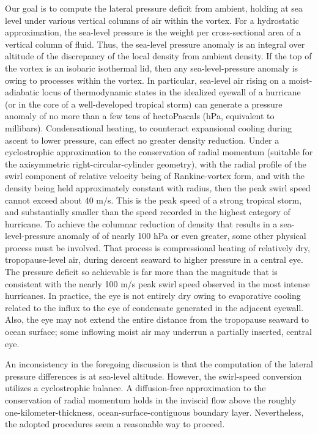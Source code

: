 \documentclass[preprint, prX]{revtex4}
\begin{document}
Our goal is to compute the lateral pressure deficit from ambient, holding at sea level under various vertical columns of air within the vortex. For a hydrostatic approximation, the sea-level pressure is the weight per cross-sectional area of a vertical column of fluid. Thus, the sea-level pressure anomaly is an integral over altitude of the discrepancy of the local density from ambient density. If the top of the vortex is an isobaric isothermal lid, then any sea-level-pressure anomaly is owing to processes within the vortex.
In particular, sea-level air rising on a moist-adiabatic locus of thermodynamic states in the idealized eyewall of a hurricane (or in the core of a well-developed tropical storm) can generate a pressure anomaly of no more than a few tens of hectoPascals (hPa, equivalent to millibars). Condensational heating, to counteract expansional cooling during ascent to lower pressure, can effect no greater density reduction. Under a cyclostrophic approximation to the conservation of radial momentum (suitable for the axisymmetric right-circular-cylinder geometry), with the radial profile of the swirl component of relative velocity being of Rankine-vortex form, and with the density being held approximately constant with radius, then the peak swirl speed cannot exceed about 40 m/s. This is the peak speed of a strong tropical storm, and substantially smaller than the speed recorded in the highest category of hurricane. 
To achieve the columnar reduction of density that results in a sea-level-pressure anomaly of of nearly 100 hPa or even greater, some other physical process must be involved. That process is compressional heating of relatively dry, tropopause-level air, during descent seaward to higher pressure in a central eye.  The pressure deficit so achievable is far more than the magnitude that is consistent with the nearly 100 m/s peak swirl speed observed in the most intense hurricanes. In practice, the eye is not entirely dry owing to evaporative cooling related to the influx to the eye of condensate generated in the adjacent eyewall. Also, the eye may not extend the entire distance from the tropopause seaward to ocean surface; some inflowing moist air may underrun a partially inserted, central eye.

An inconsistency in the foregoing discussion is that the computation of the lateral pressure differences is at sea-level altitude. However, the swirl-speed conversion utilizes a cyclostrophic balance. A diffusion-free approximation to the conservation of radial momentum holds in the inviscid flow above the roughly one-kilometer-thickness, ocean-surface-contiguous boundary layer. Nevertheless, the adopted procedures seem a reasonable way to proceed. 
\end{document}
